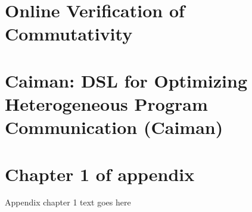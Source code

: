 \documentclass[phd,tocprelim]{cornell}
\begin{document}


\chapter{Online Verification of Commutativity}



\chapter{Caiman: DSL for Optimizing Heterogeneous Program Communication (Caiman)}

\appendix
\chapter{Chapter 1 of appendix}
Appendix chapter 1 text goes here


\end{document}
